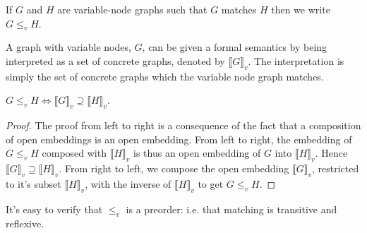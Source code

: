\documentclass[runningheads]{llncs}
\newcommand{\tensor}{\otimes}
\newcommand{\vinterp}[1]{\llbracket #1 \rrbracket_v}
\begin{document}
If $G$ and $H$ are variable-node graphs such that  $G$ matches $H$
then we write $G \leq_v H$.

A graph with variable nodes, $G$, can be given a formal semantics by
being interpreted as a set of concrete graphs, denoted by
$\vinterp{G}$. The interpretation is simply the set of concrete graphs
which the variable node graph matches. 

\begin{proposition}
\label{match-interp-thm}
$G \leq_v H \Leftrightarrow \vinterp{G} \supseteq \vinterp{H}$.
\end{proposition}
\begin{proof}
  The proof from left to right is a consequence of the fact that a
  composition of open embeddings is an open embedding. From left to
  right, the embedding of $G \leq_v H$ composed with $\vinterp{H}$ is
  thus an open embedding of $G$ into $\vinterp{H}$. Hence $\vinterp{G}
  \supseteq \vinterp{H}$. From right to left, we compose the open
  embedding $\vinterp{G}$, restricted to it's subset $\vinterp{H}$,
  with the inverse of $\vinterp{H}$ to get $G \leq_v H$.
\end{proof}

It's easy to verify that $\leq_v$ is a preorder: i.e. that
matching is transitive and reflexive.



\end{document}
